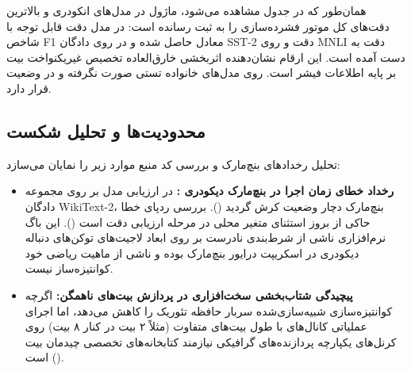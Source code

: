 همان‌طور که در جدول مشاهده می‌شود، ماژول  در مدل‌های انکودری  و  بالاترین دقت‌های کل موتور فشرده‌سازی را به ثبت رسانده است: در مدل  دقت قابل توجه  با شاخص F1 معادل  حاصل شده و در  روی دادگان SST-2 دقت  و روی MNLI دقت  به دست آمده است. این ارقام نشان‌دهنده اثربخشی خارق‌العاده تخصیص غیریکنواخت بیت بر پایه اطلاعات فیشر است. روی مدل‌های خانواده  تستی صورت نگرفته و در وضعیت  قرار دارد.

\subsection{محدودیت‌ها و تحلیل شکست}
تحلیل رخدادهای بنچ‌مارک و بررسی کد منبع موارد زیر را نمایان می‌سازد:
\begin{itemize}
    \item \textbf{رخداد خطای زمان اجرا در بنچ‌مارک دیکودری :} در ارزیابی مدل  بر روی مجموعه دادگان WikiText-2، بنچ‌مارک دچار وضعیت کرش گردید (). بررسی ردپای خطا حاکی از بروز استثنای متغیر محلی در مرحله ارزیابی دقت است (). این باگ نرم‌افزاری ناشی از شرط‌بندی نادرست بر روی ابعاد لاجیت‌های توکن‌های دنباله دیکودری در اسکریپت درایور بنچ‌مارک بوده و ناشی از ماهیت ریاضی خود کوانتیزه‌ساز نیست.
    \item \textbf{پیچیدگی شتاب‌بخشی سخت‌افزاری در پردازش بیت‌های ناهمگن:} اگرچه کوانتیزه‌سازی شبیه‌سازی‌شده سربار حافظه تئوریک را کاهش می‌دهد، اما اجرای عملیاتی کانال‌های با طول بیت‌های متفاوت (مثلاً ۲ بیت در کنار ۸ بیت) روی کرنل‌های  یکپارچه پردازنده‌های گرافیکی نیازمند کتابخانه‌های تخصصی چیدمان بیت () است.
\end{itemize}
